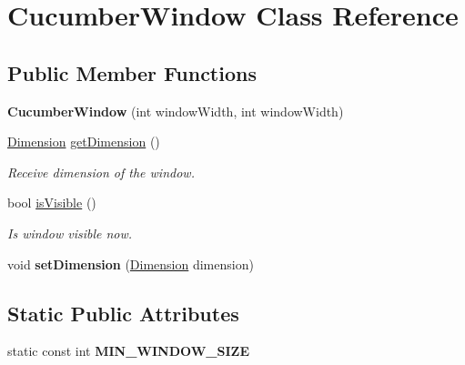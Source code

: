 \hypertarget{classCucumberWindow}{}\section{Cucumber\+Window Class Reference}
\label{classCucumberWindow}
\subsection*{Public Member Functions}
\begin{DoxyCompactItemize}
\item 
\hypertarget{classCucumberWindow_a01f36d240885524641a0ad085e703f48}{}\label{classCucumberWindow_a01f36d240885524641a0ad085e703f48} 
{\bfseries Cucumber\+Window} (int window\+Width, int window\+Width)
\item 
\hyperlink{classDimension}{Dimension} \hyperlink{classCucumberWindow_a0d2e984baf026307ec0691b69bb599d5}{get\+Dimension} ()
\begin{DoxyCompactList}\small\item\em Receive dimension of the window. \end{DoxyCompactList}\item 
\hypertarget{classCucumberWindow_a2a2998ef8cf93729749d7cf1c64daa02}{}\label{classCucumberWindow_a2a2998ef8cf93729749d7cf1c64daa02} 
bool \hyperlink{classCucumberWindow_a2a2998ef8cf93729749d7cf1c64daa02}{is\+Visible} ()
\begin{DoxyCompactList}\small\item\em Is window visible now. \end{DoxyCompactList}\item 
\hypertarget{classCucumberWindow_ac1db72b019f7f6ec2f6d65aebda2054d}{}\label{classCucumberWindow_ac1db72b019f7f6ec2f6d65aebda2054d} 
void {\bfseries set\+Dimension} (\hyperlink{classDimension}{Dimension} dimension)
\end{DoxyCompactItemize}
\subsection*{Static Public Attributes}
\begin{DoxyCompactItemize}
\item 
\hypertarget{classCucumberWindow_a1f5dd1b0514d95a93b5a85a506a08058}{}\label{classCucumberWindow_a1f5dd1b0514d95a93b5a85a506a08058} 
static const int {\bfseries M\+I\+N\+\_\+\+W\+I\+N\+D\+O\+W\+\_\+\+S\+I\+ZE}
\end{DoxyCompactItemize}


